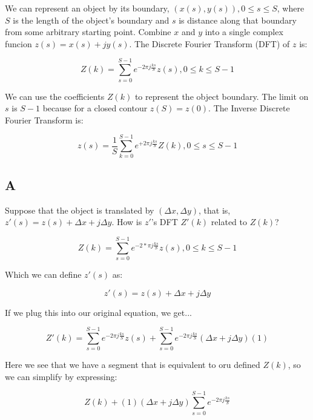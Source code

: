\documentclass{article}
\begin{document}
We can represent an object by its boundary, $(x(s),y(s)),0\leq s \leq S$, where $S$ is the length of the object's boundary and $s$ is distance along that boundary from some arbitrary starting point. Combine $x$ and $y$ into a single complex funcion $z(s)=x(s)+jy(s)$. The Discrete Fourier Transform (DFT) of $z$ is:

\begin{equation}
    Z(k) = \sum^{S-1}_{s=0} e^{-2\pi j \frac{ks}{S}} z(s), 0\leq k \leq S-1
\end{equation}

We can use the coefficients $Z(k)$ to represent the object boundary. The limit on $s$ is $S-1$ because for a closed contour $z(S)=z(0)$. The Inverse Discrete Fourier Transform is:

\begin{equation}
    z(s) = \frac{1}{S} \sum_{k=0}^{S-1} e^{+2\pi j \frac{ks}{S}} Z(k), 0 \leq s \leq S-1
\end{equation}

\subsection*{A}

Suppose that the object is translated by $(\Delta x, \Delta y)$, that is, $z'(s)=z(s) + \Delta x + j \Delta y$. How is $z'$'s DFT $Z'(k)$ related to $Z(k)$?


\begin{equation}
    Z(k) = \sum^{S-1}_{s=0} e^{-2*\pi j \frac{ks}{S}} z(s), 0\leq k \leq S-1
\end{equation}

\noindent Which we can define $z'(s)$ as:

\begin{equation}
    z'(s) = z(s) + \Delta x + j \Delta y
\end{equation}

\noindent If we plug this into our original equation, we get...

\begin{equation}
    Z'(k) = \sum_{s=0}^{S-1} e^{-2\pi j \frac{ks}{S}}z(s) + \sum_{s=0}^{S-1} e^{-2\pi j \frac{ks}{S}} (\Delta x + j \Delta y) (1)
\end{equation}

\noindent Here we see that we have a segment that is equivalent to oru defined $Z(k)$, so we can simplify by expressing:

\begin{equation}
    Z(k) + (1) (\Delta x + j \Delta y) \sum_{s=0}^{S-1} e^{-2\pi j \frac{ks}{S}}
\end{equation}
\end{document}
